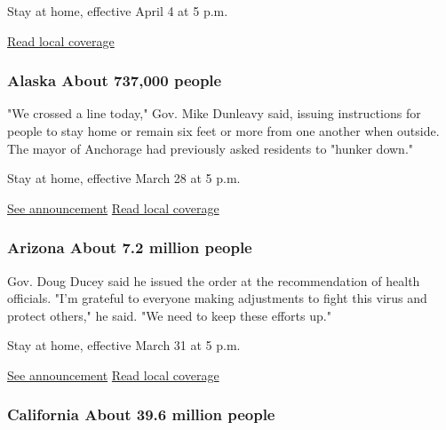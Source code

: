Stay at home, effective April 4 at 5 p.m.

\href{https://www.al.com/news/2020/04/gov-kay-ivey-to-give-update-on-coronavirus-response.html}{Read
local coverage}

\hypertarget{alaska-about-737000-people}{%
\subsubsection{Alaska About 737,000
people}\label{alaska-about-737000-people}}

"We crossed a line today," Gov. Mike Dunleavy said, issuing instructions
for people to stay home or remain six feet or more from one another when
outside. The mayor of Anchorage had previously asked residents to
"hunker down."

Stay at home, effective March 28 at 5 p.m.

\href{http://dhss.alaska.gov/News/Documents/press/2020/FAQs_03272020-SOA-COVID-19-Health-Mandate-011-012.pdf}{See
announcement} \textbar{}
\href{https://www.adn.com/alaska-news/2020/03/27/anchorage-sees-first-covid-19-death-in-alaska-hospital-officials-say/}{Read
local coverage}

\hypertarget{arizona-about-72-million-people}{%
\subsubsection{Arizona About 7.2 million
people}\label{arizona-about-72-million-people}}

Gov. Doug Ducey said he issued the order at the recommendation of health
officials. "I'm grateful to everyone making adjustments to fight this
virus and protect others," he said. "We need to keep these efforts up."

Stay at home, effective March 31 at 5 p.m.

\href{https://azgovernor.gov/governor/news/2020/03/new-executive-order-stay-home-stay-healthy-stay-connected}{See
announcement} \textbar{}
\href{https://www.azcentral.com/story/news/local/arizona-health/2020/03/30/arizona-coronavirus-stay-home-order-issued-gov-doug-ducey/5088109002/}{Read
local coverage}

\hypertarget{california-about-396-million-people}{%
\subsubsection{California About 39.6 million
people}\label{california-about-396-million-people}}

